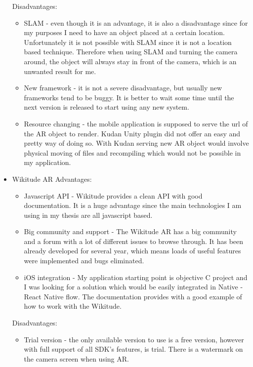\documentclass[thesis=M,english]{FITthesis}[2012/10/20]
\begin{document}
\begin{itemize}
\begin{itemize}
	\end{itemize}
	
	Disadvantages:
	\begin{itemize}
		\item{SLAM} - even though it is an advantage, it is also a disadvantage since for my purposes I need to have an object placed at a certain location. Unfortunately it is not possible with SLAM since it is not a location based technique. Therefore when using SLAM and turning the camera around, the object will always stay in front of the camera, which is an unwanted result for me.
		\item{New framework} - it is not a severe disadvantage, but usually new frameworks tend to be buggy. It is better to wait some time until the next version is released to start using any new system.
		\item{Resource changing} - the mobile application is supposed to serve the url of the AR object to render. Kudan Unity plugin did not offer an easy and pretty way of doing so. With Kudan serving new AR object would involve physical moving of files and recompiling which would not be possible in my application.
	\end{itemize}	
	\item{Wikitude AR}
	Advantages:
	\begin{itemize}
		\item{Javascript API} - Wikitude provides a clean API with good documentation. It is a huge advantage since the main technologies I am using in my thesis are all javascript based.
		\item{Big community and support} - The Wikitude AR has a big community and a forum with a lot of different issues to browse through. It has been already developed for several year, which means loads of useful features were implemented and bugs eliminated.
		\item{iOS integration} - My application starting point is objective C project and I was looking for a solution which would be easily integrated in Native - React Native flow. The documentation provides with a good example of how to work with the Wikitude.
		\			
	\end{itemize}
	
	Disadvantages:
	\begin{itemize}
		\item{Trial version} - the only available version to use is a free version, however with full support of all SDK's features, is trial. There is a watermark on the camera screen when using AR.
	\end{itemize}		
\end{itemize}
\end{document}

